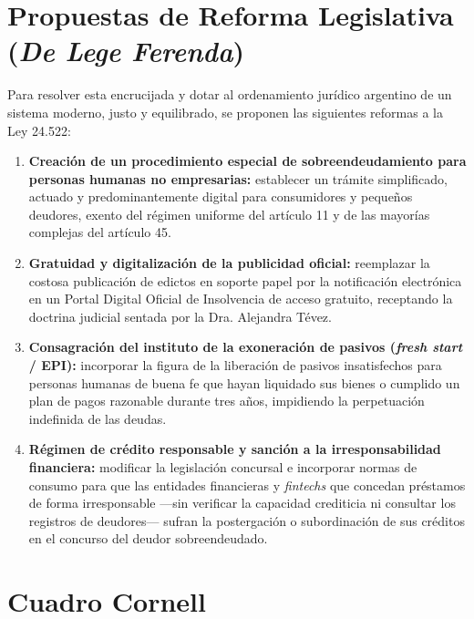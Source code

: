 \documentclass[12pt,oneside]{book}
\begin{document}
\section{Propuestas de Reforma Legislativa (\textit{De Lege Ferenda})}

Para resolver esta encrucijada y dotar al ordenamiento jurídico argentino de un sistema moderno, justo y equilibrado, se proponen las siguientes reformas a la Ley 24.522:

\begin{enumerate}
    \item \textbf{Creación de un procedimiento especial de sobreendeudamiento para personas humanas no empresarias:} establecer un trámite simplificado, actuado y predominantemente digital para consumidores y pequeños deudores, exento del régimen uniforme del artículo 11 y de las mayorías complejas del artículo 45.

    \item \textbf{Gratuidad y digitalización de la publicidad oficial:} reemplazar la costosa publicación de edictos en soporte papel por la notificación electrónica en un Portal Digital Oficial de Insolvencia de acceso gratuito, receptando la doctrina judicial sentada por la Dra. Alejandra Tévez.

    \item \textbf{Consagración del instituto de la exoneración de pasivos (\textit{fresh start} / EPI):} incorporar la figura de la liberación de pasivos insatisfechos para personas humanas de buena fe que hayan liquidado sus bienes o cumplido un plan de pagos razonable durante tres años, impidiendo la perpetuación indefinida de las deudas.

    \item \textbf{Régimen de crédito responsable y sanción a la irresponsabilidad financiera:} modificar la legislación concursal e incorporar normas de consumo para que las entidades financieras y \textit{fintechs} que concedan préstamos de forma irresponsable ---sin verificar la capacidad crediticia ni consultar los registros de deudores--- sufran la postergación o subordinación de sus créditos en el concurso del deudor sobreendeudado.
\end{enumerate}

\section{Cuadro Cornell}
\end{document}
